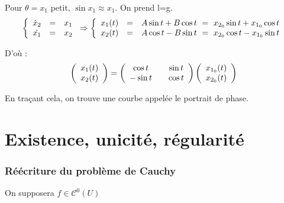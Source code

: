 \bigskip
{}

Pour $\theta=x_1$ petit, $\sin x_1 \approx x_1$. On prend l=g.
\[
\left\{
\begin{array}{r c l}
\dot{x}_2 &=& x_1\\
\dot{x_1} &=& x_2
\end{array}
\right.
\Rightarrow
\left\{
\begin{array}{r c l}
x_1(t) &=& A\sin t + B\cos t \text{  }= \text{  } x_{2_0}\sin t + x_{1_0} \cos t\\
x_2(t) &=& A\cos t - B\sin t \text{  }= \text{  } x_{2_0}\cos t - x_{1_0} \sin t
\end{array}
\right.
\]

D'où :
\[
\left(
\begin{array}{c}
x_1(t)\\
x_2(t)
\end{array}
\right)
= \left(
\begin{array}{c c c}
\cos t & & \sin t\\
-\sin t & & \cos t
\end{array}
\right)
\left(
\begin{array}{c}
x_{1_0}(t)\\
x_{2_0}(t)
\end{array}
\right)
\]

En traçant cela, on trouve une courbe appelée le portrait de phase.

\newpage
\part{Existence, unicité, régularité}
\section{Réécriture du problème de Cauchy}
On supposera $f\in \mathcal{C}^0(U)$

\bigskip
{}

